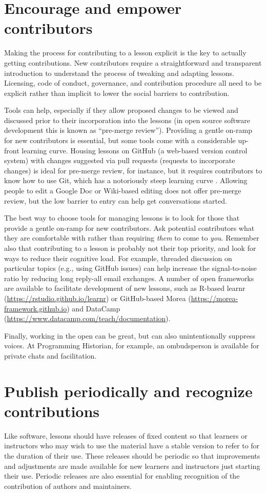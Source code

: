 \documentclass[10pt,letterpaper]{article}
\newcommand{\rulemajor}[1]{\section{#1}}
\begin{document}
\rulemajor{Encourage and empower contributors}

Making the process for contributing to a lesson explicit is
the key to actually getting contributions.
New contributors require a straightforward and transparent introduction
to understand the process of tweaking and adapting lessons.
Licensing, code of conduct, governance, and contribution procedure
all need to be explicit rather than implicit
to lower the social barriers to contribution.

Tools can help,
especially if they allow proposed changes to be viewed and discussed
prior to their incorporation into the lessons
(in open source software development this is known as ``pre-merge review'').
Providing a gentle on-ramp for new contributors is essential,
but some tools come with a considerable up-front learning curve.
Housing lessons on GitHub (a web-based version control system)
with changes suggested via pull requests (requests to incorporate changes) is 
ideal for pre-merge review, for instance,
but it requires contributors to know how to use Git,
which has a notoriously steep learning curve \cite{git-survey}.
Allowing people to edit a Google Doc or Wiki-based editing does not offer pre-merge review,
but the low barrier to entry can help get conversations started.

The best way to choose tools for managing lessons
is to look for those that provide a gentle on-ramp for new contributors.
Ask potential contributors what they are comfortable with
rather than requiring \emph{them} to come to \emph{you}.
Remember also that contributing to a lesson is probably not their top priority,
and look for ways to reduce their cognitive load.
For example,
threaded discussion on particular topics (e.g., using GitHub issues)
can help increase the signal-to-noise ratio
by reducing long reply-all email exchanges. 
A number of open frameworks are available to facilitate  
development of new lessons, such as R-based
learnr (\url{https://rstudio.github.io/learnr}) or 
GitHub-based Morea (\url{https://morea-framework.github.io}) and 
DataCamp (\url{https://www.datacamp.com/teach/documentation}).

Finally,
working in the open can be great,
but can also unintentionally suppress voices.
At Programming Historian,
for example,
an ombudsperson is available for private chats and facilitation.

\rulemajor{Publish periodically and recognize contributions}

Like software,
lessons should have releases of fixed content
so that learners or instructors who may wish to use the material have a stable version to refer to
for the duration of their use.
These releases should be periodic
so that improvements and adjustments are made available
for new learners and instructors just starting their use.
Periodic releases are also essential
for enabling recognition of the contribution of authors and maintainers.
\end{document}
